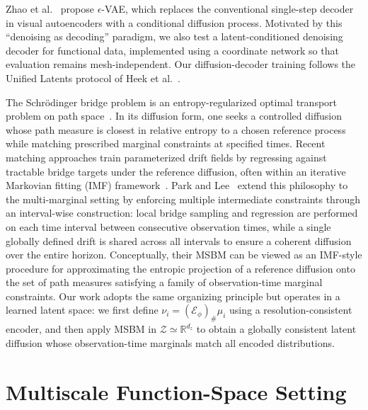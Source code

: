 \documentclass[review,onefignum,onetabnum]{siamart250211}
\newcommand{\R}{\mathbb{R}}
\newcommand{\1}{\mathbf{1}}
\newcommand{\cZ}{\mathcal{Z}}
\newcommand{\cE}{\mathcal{E}}
\begin{document}
Zhao et al.~\cite{zhao2025epsilonvae} propose $\epsilon$-VAE, which replaces the conventional single-step decoder in visual autoencoders with a conditional diffusion process. Motivated by this ``denoising as decoding'' paradigm, we also test a latent-conditioned denoising decoder for functional data, implemented using a coordinate network so that evaluation remains mesh-independent. Our diffusion-decoder training follows the Unified Latents protocol of Heek et al.~\cite{heek2026ul}.

The Schr\"odinger bridge problem is an entropy-regularized optimal transport problem on path space~\cite{schrodinger1931,leonard2013survey}. In its diffusion form, one seeks a controlled diffusion whose path measure is closest in relative entropy to a chosen reference process while matching prescribed marginal constraints at specified times. Recent matching approaches train parameterized drift fields by regressing against tractable bridge targets under the reference diffusion, often within an iterative Markovian fitting (IMF) framework~\cite{shi2024sbm}. Park and Lee~\cite{park2025msbm} extend this philosophy to the multi-marginal setting by enforcing multiple intermediate constraints through an interval-wise construction: local bridge sampling and regression are performed on each time interval between consecutive observation times, while a single globally defined drift is shared across all intervals to ensure a coherent diffusion over the entire horizon. Conceptually, their \textsc{MSBM} can be viewed as an IMF-style procedure for approximating the entropic projection of a reference diffusion onto the set of path measures satisfying a family of observation-time marginal constraints. Our work adopts the same organizing principle but operates in a learned latent space: we first define $\nu_i=(\cE_\phi)_\#\mu_i$ using a resolution-consistent encoder, and then apply \textsc{MSBM} in $\cZ\simeq\R^{d_z}$ to obtain a globally consistent latent diffusion whose observation-time marginals match all encoded distributions.


\section{Multiscale Function-Space Setting}\label{sec:setting}
\end{document}
